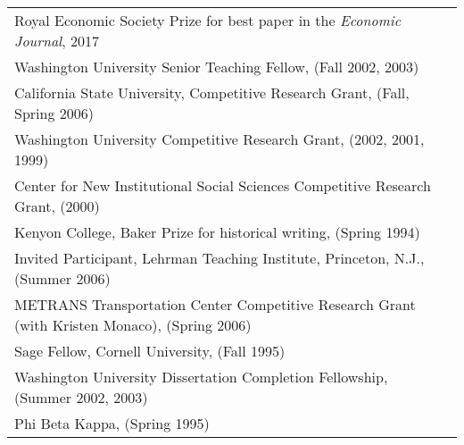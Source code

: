 \documentclass[11pt,fullpage]{article}
\begin{document}
\begin{tabular}{ll}
	Royal Economic Society Prize for best paper in the \textit{Economic Journal}, 2017 \\
	Washington University Senior Teaching Fellow, (Fall 2002, 2003) \\
	California State University, Competitive Research Grant, (Fall, Spring 2006) \\
	Washington University Competitive Research Grant, (2002, 2001, 1999) \\
	Center for New Institutional Social Sciences Competitive Research Grant, (2000) \\
	Kenyon College, Baker Prize for historical writing, (Spring 1994) \\
	Invited Participant, Lehrman Teaching Institute, Princeton, N.J., (Summer 2006) \\
	METRANS Transportation Center Competitive Research Grant (with Kristen Monaco), (Spring 2006) \\
	Sage Fellow, Cornell University, (Fall 1995) \\
	Washington University Dissertation Completion Fellowship, (Summer 2002, 2003) \\
	Phi Beta Kappa, (Spring 1995)	\\
\end{tabular}	
\end{document}
